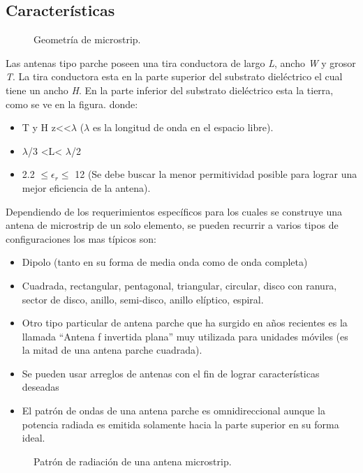 \documentclass[
	12pt, %
	fleqn, %
	a4paper, %
	oneside, %
]{LegrandOrangeBook}
\begin{document}
\subsection{Características}
\begin{figure}[H]
\centering
{}
\caption{Geometría de microstrip.}
\end{figure}
Las antenas tipo parche poseen una tira conductora de largo \textit{L}, ancho \textit{W} y grosor \textit{T}. La tira conductora esta en la parte superior del substrato dieléctrico el cual tiene un ancho \textit{H}. En la parte inferior del substrato dieléctrico esta la tierra, como se ve en la figura.
donde:
\begin{itemize}
\item T y H z<<$\lambda$  ($\lambda$ es la longitud de onda en el espacio libre).
\item $\lambda$/3 <L< $\lambda$/2
\item 2.2 $\leq\epsilon_r\leq$ 12 (Se debe buscar la menor permitividad posible para lograr una mejor eficiencia de la antena).
\end{itemize}
Dependiendo de los requerimientos específicos para los cuales se construye una antena de microstrip de un solo elemento, se pueden recurrir a varios tipos de configuraciones los mas típicos son:
\begin{itemize}
\item Dipolo (tanto en su forma de media onda como de onda completa)
\item Cuadrada, rectangular, pentagonal, triangular, circular, disco con ranura, sector de disco, anillo, semi-disco, anillo elíptico, espiral.
\item Otro tipo particular de antena parche que ha surgido en años recientes es la llamada ``Antena  f  invertida plana'' muy utilizada para unidades móviles (es la mitad de una antena parche cuadrada).
\item Se pueden usar arreglos de antenas con el fin de lograr características deseadas 
\item El patrón de ondas de una antena parche es omnidireccional aunque la potencia radiada es emitida  solamente hacia la parte superior en su forma ideal.
\end{itemize}
\begin{figure}[]
\centering
{}
\caption{Patrón de radiación de una antena microstrip.}
\end{figure}
\end{document}
